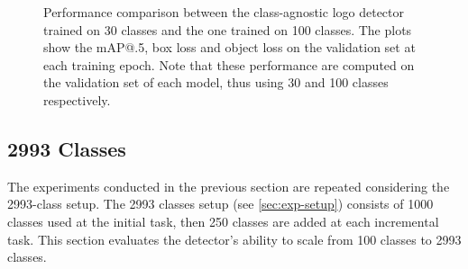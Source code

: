 \begin{figure}[H]
	\centering
    \qquad
    \qquad
    \caption{Performance comparison between the class-agnostic logo detector trained on 30 classes and the one trained on 100 classes. The plots show the mAP@.5, box loss and object loss on the validation set at each training epoch. Note that these performance are computed on the validation set of each model, thus using 30 and 100 classes respectively.}%
	\label{fig:exp-det_100}
\end{figure}


\subsection{2993 Classes}
\label{sec:2993-detector}
The experiments conducted in the previous section are repeated considering the 2993-class setup.
The 2993 classes setup (see \autoref{sec:exp-setup}) consists of 1000 classes used at the initial task, then 250 classes are added at each incremental task.
This section evaluates the detector's ability to scale from 100 classes to 2993 classes.

